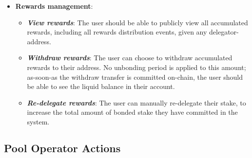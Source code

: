 \begin{itemize}
    \item \textbf{Rewards management}: 
    \begin{itemize}
        \item \textit{\textbf{View rewards}}: The user should be able to publicly view all accumulated rewards, including all rewards distribution events, given any delegator-address.  
        \item \textit{\textbf{Withdraw rewards}}: The user can choose to withdraw accumulated rewards to their address. No unbonding period is applied to this amount; as-soon-as the withdraw transfer is committed on-chain, the user should be able to see the liquid balance in their account. 
        \item \textit{\textbf{Re-delegate rewards}}: The user can manually re-delegate their stake, to increase the total amount of bonded stake they have committed in the system.   
    \end{itemize}
\end{itemize}

\subsection{Pool Operator Actions} \label{pool_actions}

